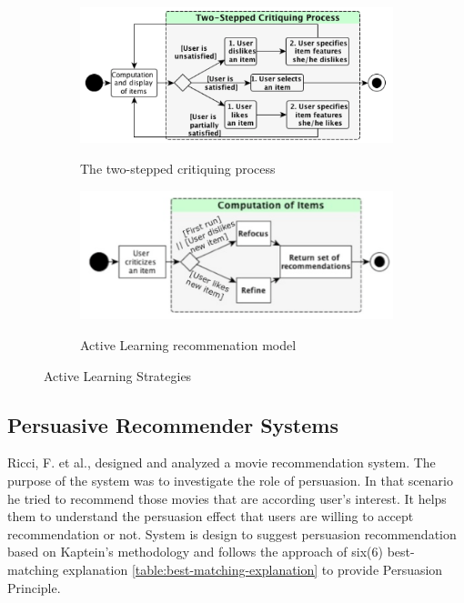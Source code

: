 \begin{figure}[h]
	\centering
	\begin{subfigure}{.70\textwidth}
	\includegraphics[width=1\linewidth]{figures/ch2_lamche2014active_1.png}
	\caption{The two-stepped critiquing process}
	\cite{lamche2014active}
	\label{fig:ch2_lamche2014active_1}
	\end{subfigure}
	\begin{subfigure}{.70\textwidth}
	\includegraphics[width=1\linewidth]{figures/ch2_lamche2014active_2.png}
	\caption{Active Learning recommenation model}
	\cite{lamche2014active}
	\label{fig:ch2_lamche2014active_2}
	\end{subfigure}
	\caption{Active Learning Strategies}
	\label{fig:lamche2014active}
\end{figure}

\subsection{Persuasive Recommender Systems}

Ricci, F. et al.,\cite{gkika2014persuasive} designed and analyzed a movie recommendation system. The purpose of the system was to investigate the role of persuasion. In that scenario he  tried to recommend those movies that are according user’s interest. It helps them to understand the persuasion effect that users are willing to accept recommendation or not. System is design to suggest persuasion recommendation based on Kaptein’s \cite{kaptein2012adaptive} methodology and follows the approach of six(6) best-matching explanation \ref{table:best-matching-explanation} to provide Persuasion Principle.\newline

